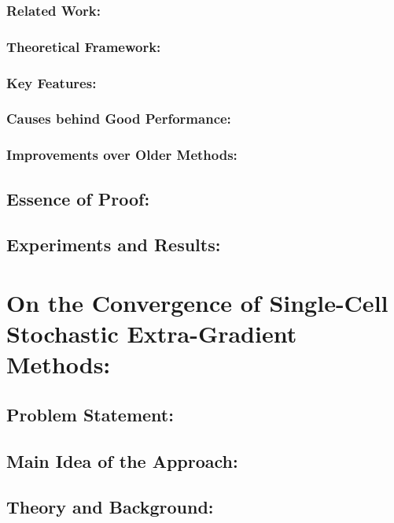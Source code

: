 \documentclass[11pt]{article}
\begin{document}
		\subsubsection{Related Work:}
		
		\subsubsection{Theoretical Framework:}
		
		\subsubsection{Key Features:}
		
		\subsubsection{Causes behind Good Performance:}
		
		\subsubsection{Improvements over Older Methods:}
	
	\subsection{Essence of Proof:} %
	
	\subsection{Experiments and Results:}

\section{On the Convergence of Single-Cell Stochastic Extra-Gradient Methods:}

	\subsection{Problem Statement:}
	
	\subsection{Main Idea of the Approach:}
	
	\subsection{Theory and Background:}
	
\end{document}
